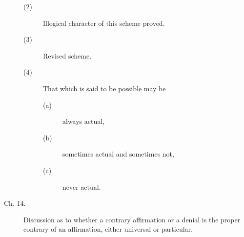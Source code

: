 \begin{description}
\begin{description}
\item[(2)] Illogical character of this scheme proved. 

\item[(3)] Revised scheme. 

\item[(4)] That which is said to be possible may be

\begin{description}
\item[(a)] always actual, 
\item[(b)] sometimes actual and sometimes not,
\item[(c)] never actual. 
\end{description}

\end{description}

\item[Ch. 14.] Discussion as to whether a contrary affirmation or a denial 
is the proper contrary of an affirmation, either universal or 
particular. 

\end{description}

\renewcommand{\aref}{\arefC}
